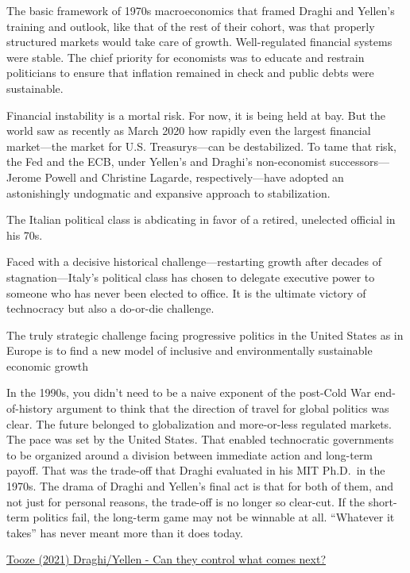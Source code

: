 \documentclass[
]{book}
\begin{document}
The basic framework of 1970s macroeconomics that framed Draghi and Yellen's training and outlook, like that of the rest of their cohort, was that properly structured markets would take care of growth. Well-regulated financial systems were stable. The chief priority for economists was to educate and restrain politicians to ensure that inflation remained in check and public debts were sustainable.

Financial instability is a mortal risk. For now, it is being held at bay. But the world saw as recently as March 2020 how rapidly even the largest financial market---the market for U.S. Treasurys---can be destabilized. To tame that risk, the Fed and the ECB, under Yellen's and Draghi's non-economist successors---Jerome Powell and Christine Lagarde, respectively---have adopted an astonishingly undogmatic and expansive approach to stabilization.

The Italian political class is abdicating in favor of a retired, unelected official in his 70s.

Faced with a decisive historical challenge---restarting growth after decades of stagnation---Italy's political class has chosen to delegate executive power to someone who has never been elected to office. It is the ultimate victory of technocracy but also a do-or-die challenge.

The truly strategic challenge facing progressive politics in the United States as in Europe is to find a new model of inclusive and environmentally sustainable economic growth

In the 1990s, you didn't need to be a naive exponent of the post-Cold War end-of-history argument to think that the direction of travel for global politics was clear. The future belonged to globalization and more-or-less regulated markets. The pace was set by the United States. That enabled technocratic governments to be organized around a division between immediate action and long-term payoff. That was the trade-off that Draghi evaluated in his MIT Ph.D.~in the 1970s. The drama of Draghi and Yellen's final act is that for both of them, and not just for personal reasons, the trade-off is no longer so clear-cut. If the short-term politics fail, the long-term game may not be winnable at all. ``Whatever it takes'' has never meant more than it does today.

\href{https://foreignpolicy.com/2021/04/01/janet-yellen-mario-draghi-italy-united-states-technocrats-capitalist-democracy/}{Tooze (2021) Draghi/Yellen - Can they control what comes next?}
\end{document}

